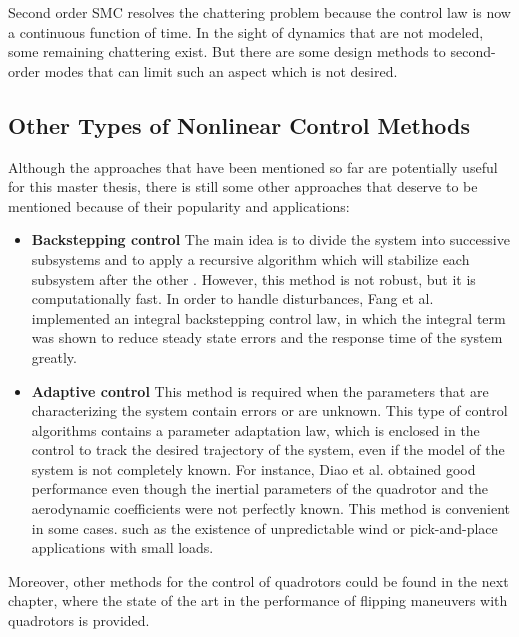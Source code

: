 \documentclass{thesisreport}
\begin{document}
\noindent Second order SMC resolves the chattering problem because the control law is now a continuous function of time. 
In the sight of dynamics that are not modeled, some remaining chattering exist. But there are some design methods to second-order modes that can limit such an aspect which is not desired.

\newpage

 \subsection{Other Types of Nonlinear Control Methods}
 
Although the approaches that have been mentioned so far are potentially useful for this master thesis, there is still some other approaches that deserve to be mentioned because of their popularity and applications:


\begin{itemize}
\setlength{\itemindent}{-.5in}
	\item [] \textbf{Backstepping control} The main idea is to divide the system into successive subsystems and to apply a recursive algorithm which will stabilize each subsystem after the other \cite{Madani2006}. However, this method is not robust, but it is computationally fast. In order to handle disturbances, Fang et al. \cite{Gao2011} implemented an integral backstepping control law, in which the integral term was shown to reduce steady state errors and the response time of the system greatly. 

	\item [] \textbf{Adaptive control} This method is required when the parameters that are characterizing the system contain errors or are unknown. This type of control algorithms contains a parameter adaptation law, which is enclosed in the control to track the desired trajectory of the system, even if the model of the system is not completely known.
For instance, Diao et al. \cite{Diao2011} obtained good performance even though the inertial parameters of the quadrotor and the aerodynamic coefficients were not perfectly known.
This method is convenient in some cases. such as the existence of unpredictable wind \cite{Antonelli2013} or pick-and-place applications with small loads. 
	 
 \end{itemize}
 
\noindent Moreover, other methods for the control of quadrotors could be found  in the next chapter, where the state of the art in the performance of flipping maneuvers with quadrotors is provided. 
 
\end{document}

